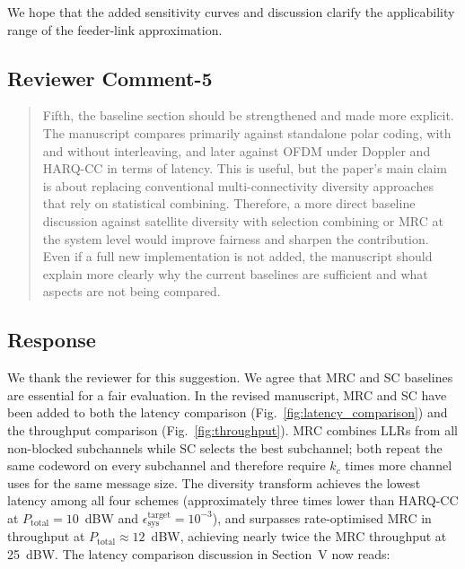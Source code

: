 We hope that the added sensitivity curves and discussion clarify the applicability range of the feeder-link approximation.


\subsection{Reviewer Comment-5}



\begin{mdframed}
\begin{quote}
Fifth, the baseline section should be strengthened and made more explicit. The manuscript compares primarily against standalone polar coding, with and without interleaving, and later against OFDM under Doppler and HARQ-CC in terms of latency. This is useful, but the paper's main claim is about replacing conventional multi-connectivity diversity approaches that rely on statistical combining. Therefore, a more direct baseline discussion against satellite diversity with selection combining or MRC at the system level would improve fairness and sharpen the contribution. Even if a full new implementation is not added, the manuscript should explain more clearly why the current baselines are sufficient and what aspects are not being compared.

\end{quote}

\end{mdframed}


\subsection{Response}

We thank the reviewer for this suggestion. We agree that MRC and SC baselines are essential for a fair evaluation. In the revised manuscript, MRC and SC have been added to both the latency comparison (Fig.~\ref{fig:latency_comparison}) and the throughput comparison (Fig.~\ref{fig:throughput}). MRC combines LLRs from all non-blocked subchannels while SC selects the best subchannel; both repeat the same codeword on every subchannel and therefore require $k_c$ times more channel uses for the same message size. The diversity transform achieves the lowest latency among all four schemes (approximately three times lower than HARQ-CC at $P_{\mathrm{total}} = 10$~dBW and $\epsilon_{\mathrm{sys}}^{\mathrm{target}} = 10^{-3}$), and surpasses rate-optimised MRC in throughput at $P_{\mathrm{total}} \approx 12$~dBW, achieving nearly twice the MRC throughput at 25~dBW. The latency comparison discussion in Section~V now reads:

